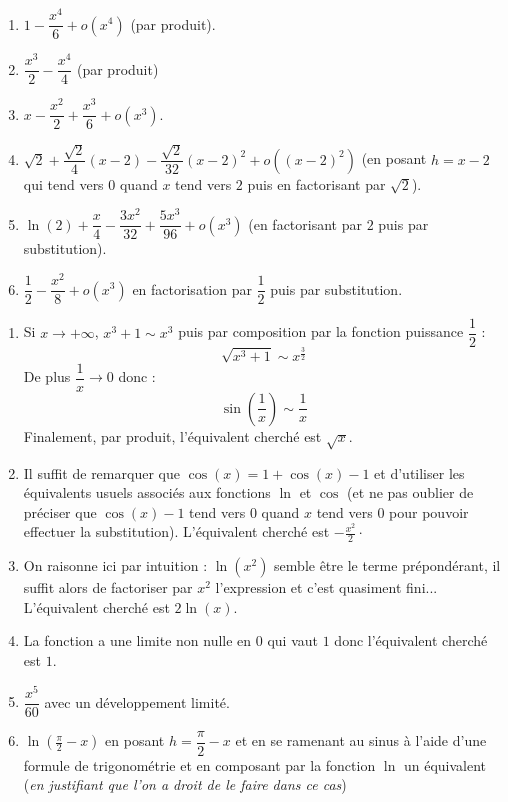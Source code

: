 \documentclass[a4paper,twoside,french,11pt]{VcCours}
\begin{document}
\begin{Exercice}{}\end{Exercice}

\begin{enumerate}
\item $1- \dfrac{x^4}{6}+o(x^4)$ (par produit).
\item $\dfrac{x^3}{2}- \dfrac{x^4}{4}$ (par produit)
\item $x - \dfrac{x^2}{2} + \dfrac{x^3}{6}+ o(x^3)$.
\item $\sqrt{2} + \dfrac{\sqrt{2}}{4}(x-2) - \dfrac{\sqrt{2}}{32}(x-2)^2+o((x-2)^2)$ (en posant $h=x-2$ qui tend vers $0$ quand $x$ tend vers $2$ puis en factorisant par $\sqrt{2}$).
\item $\ln(2) +\dfrac{x}{4} - \dfrac{3x^2}{32} + \dfrac{5x^3}{96} + o(x^3)$ (en factorisant par $2$ puis par substitution).
\item $\dfrac{1}{2}- \dfrac{x^2}{8}+ o(x^3)$ en factorisation par $\dfrac{1}{2}$ puis par substitution.
\end{enumerate}



\begin{Exercice}{}\end{Exercice}

\begin{enumerate}
\item Si $x \rightarrow + \infty$, $x^3 + 1 \sim x^3$ puis par composition par la fonction puissance $\dfrac{1}{2}$ :
$$ \sqrt{x^3+1} \sim x^{\frac{3}{2}}$$
De plus $\dfrac{1}{x} \rightarrow 0$ donc :
$$ \sin \left( \frac{1}{x} \right) \sim \frac{1}{x}$$
Finalement, par produit, l'équivalent cherché est $  \sqrt{x}$.
\item Il suffit de remarquer que $\cos(x)=1+ \cos(x)-1$ et d'utiliser les équivalents usuels associés aux fonctions $\ln$ et $\cos$ (et ne pas oublier de préciser que $\cos(x)-1$ tend vers $0$ quand $x$ tend vers $0$ pour pouvoir effectuer la substitution). L'équivalent cherché est $  - \frac{x^2}{2} \cdot$
\item On raisonne ici par intuition : $\ln(x^2)$ semble être le terme prépondérant, il suffit alors de factoriser par $x^2$ l'expression et c'est quasiment fini... L'équivalent cherché est $  2 \ln(x)$.
\item La fonction a une limite non nulle en $0$ qui vaut $1$ donc l'équivalent cherché est $1$.
\item $\dfrac{x^5}{60}$ avec un développement limité.
\item $\ln( \frac{\pi}{2}-x)$ en posant $h=\dfrac{\pi}{2}-x$ et en se ramenant au sinus à l'aide d'une formule de trigonométrie et en composant par la fonction $\ln$ un équivalent (\textit{en justifiant que l'on a droit de le faire dans ce cas})
\end{enumerate}
\end{document}
